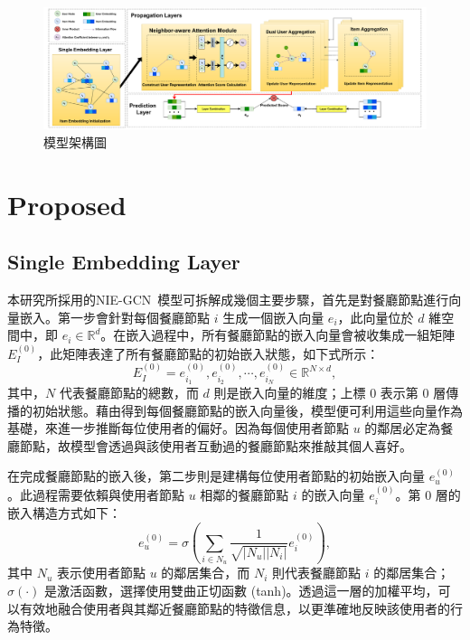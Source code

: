 \color{blue}

\begin{figure}[htbp]
    \centering
    \includegraphics[width=\textwidth]{img/Model.pdf} %
    \caption{模型架構圖}
    \label{fig:cross-column}
\end{figure}

\section{Proposed}
\subsection{Single Embedding Layer}
    本研究所採用的NIE-GCN\cite{NIE-GCN}~模型可拆解成幾個主要步驟，首先是對餐廳節點進行向量嵌入。第一步會針對每個餐廳節點 $i$ 生成一個嵌入向量 $e_i$，此向量位於 $d$ 維空間中，即 $e_i \in \mathbb{R}^d$。在嵌入過程中，所有餐廳節點的嵌入向量會被收集成一組矩陣 $E_I^{(0)}$，此矩陣表達了所有餐廳節點的初始嵌入狀態，如下式所示： 
    \begin{equation} 
        E_I^{(0)} = {e_{i_1}^{(0)}, e_{i_2}^{(0)},\cdots,e_{i_N}^{(0)}} \in \mathbb{R}^{N \times d}, 
    \end{equation}
    其中，$N$ 代表餐廳節點的總數，而 $d$ 則是嵌入向量的維度；上標 $0$ 表示第 0 層傳播的初始狀態。藉由得到每個餐廳節點的嵌入向量後，模型便可利用這些向量作為基礎，來進一步推斷每位使用者的偏好。因為每個使用者節點 $u$ 的鄰居必定為餐廳節點，故模型會透過與該使用者互動過的餐廳節點來推敲其個人喜好。

    在完成餐廳節點的嵌入後，第二步則是建構每位使用者節點的初始嵌入向量 $e_u^{(0)}$。此過程需要依賴與使用者節點 $u$ 相鄰的餐廳節點 $i$ 的嵌入向量 $e_i^{(0)}$。第 0 層的嵌入構造方式如下： 
    \begin{equation} 
        e_u^{(0)} = \sigma \left(\sum_{i \in N_u} \frac{1}{\sqrt{\vert N_u \vert \vert N_i \vert}}e_i^{(0)}\right), 
        \label{eq-e_u^0}
    \end{equation} 
    其中 $N_u$ 表示使用者節點 $u$ 的鄰居集合，而 $N_i$ 則代表餐廳節點 $i$ 的鄰居集合；$\sigma(\cdot)$ 是激活函數，選擇使用雙曲正切函數 (tanh)。透過這一層的加權平均，可以有效地融合使用者與其鄰近餐廳節點的特徵信息，以更準確地反映該使用者的行為特徵。

